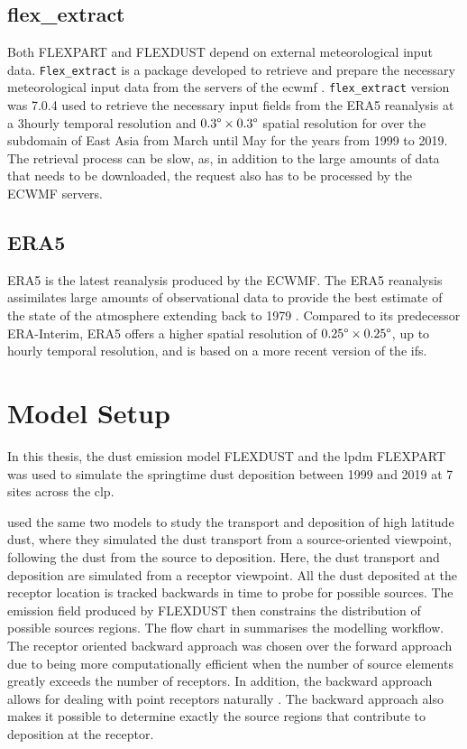 \subsection{flex\_extract}
Both FLEXPART and FLEXDUST depend on external meteorological input data. \verb|Flex_extract| is a package developed to retrieve and prepare the necessary meteorological input data from the servers of the \acrfull{ecwmf} \parencite{tipka_flex_extract_2020}. 
\verb|flex_extract| version was 7.0.4 used to retrieve the necessary input fields from the ERA5 reanalysis at a 3hourly temporal resolution and $0.3\degree \times 0.3\degree$ spatial resolution for over the subdomain of East Asia from March until May for the years from 1999 to 2019. 
The retrieval process can be slow, as, in addition to the large amounts of data that needs to be downloaded, the request also has to be processed by the ECWMF servers.


\subsection{ERA5}
ERA5 is the latest reanalysis produced by the ECWMF. 
The ERA5 reanalysis assimilates large amounts of observational data to provide the best estimate of the state of the atmosphere extending back to 1979 \parencite{hersbach_era5_2020}. Compared to its predecessor ERA-Interim, ERA5 offers a higher spatial resolution of $0.25\degree \times 0.25\degree$, up to hourly temporal resolution, and is based on a more recent version of the \acrfull{ifs}. 


\section{Model Setup}\label{sec:Model_setup}

In this thesis, the dust emission model FLEXDUST and the \acrshort{lpdm} FLEXPART was used to 
simulate the springtime dust deposition between 1999 and 2019 at 7 sites across the \acrshort{clp}. 

\textcite{flexdust_ref_2016} used the same two models to study the transport and deposition of high latitude dust, where they simulated the dust transport from a source-oriented viewpoint, following the dust from the source to deposition. 
Here, the dust transport and deposition are simulated from a receptor viewpoint. 
All the dust deposited at the receptor location is tracked backwards in time to probe for possible sources. 
The emission field produced by FLEXDUST then constrains the distribution of possible sources regions. 
The flow chart in  summarises the modelling workflow. The receptor oriented backward approach was chosen over the forward approach due to being more computationally efficient when the number of source elements greatly exceeds the number of receptors. 
In addition, the backward approach allows for dealing with point receptors naturally \parencite{seibert2004source}. 
The backward approach also makes it possible to determine exactly the source regions that contribute to deposition at the receptor. 

